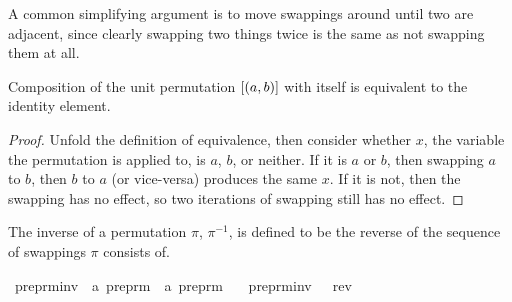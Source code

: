 A common simplifying argument is to move swappings around until two are adjacent, since clearly swapping two things twice is the same as not swapping them at all.

\begin{lemma}
\label{lemma:unit-involution}
Composition of the unit permutation \([\left(a, b\right)]\) with itself is equivalent to the identity element.
\end{lemma}
\begin{proof}
Unfold the definition of equivalence, then consider whether \(x\), the variable the permutation is applied to, is \(a\), \(b\), or neither.
If it is \(a\) or \(b\), then swapping \(a\) to \(b\), then \(b\) to \(a\) (or vice-versa) produces the same \(x\).
If it is not, then the swapping has no effect, so two iterations of swapping still has no effect.
\end{proof}

\begin{definition}
The inverse of a permutation \(\pi\), \(\pi^{-1}\), is defined to be the reverse of the sequence of swappings \(\pi\) consists of.
\end{definition}

\begin{implementation}
\isamarkupfalse%
\ preprm{\isacharunderscore}inv\ {\isacharcolon}{\isacharcolon}\ {\isachardoublequoteopen}{\isacharprime}a\ preprm\ {\isasymRightarrow}\ {\isacharprime}a\ preprm{\isachardoublequoteclose}\ \isanewline
\ \ {\isachardoublequoteopen}preprm{\isacharunderscore}inv\ {\isasympi}\ {\isasymequiv}\ rev\ {\isasympi}{\isachardoublequoteclose}\isanewline
\end{implementation}

